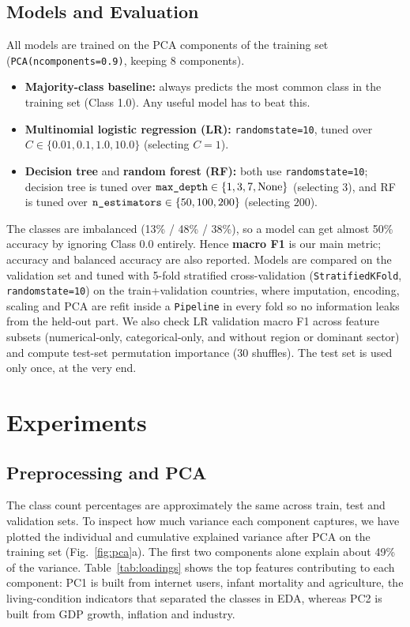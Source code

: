 \documentclass[10pt,a4paper]{article}
\renewcommand{\_}{\oldus\allowbreak}
\begin{document}
\subsection{Models and Evaluation}

All models are trained on the PCA components of the training set
(\texttt{PCA(n\_components=0.9)}, keeping 8 components).
\begin{itemize}[leftmargin=*]
  \item \textbf{Majority-class baseline:} always predicts the most common
        class in the training set (Class 1.0). Any useful model has to beat
        this.
  \item \textbf{Multinomial logistic regression (LR):} \texttt{random\_state=10},
        tuned over $C \in \{0.01, 0.1, 1.0, 10.0\}$ (selecting $C=1$).
  \item \textbf{Decision tree} and \textbf{random forest (RF):} both use
        \texttt{random\_state=10}; decision tree is tuned over
        $\texttt{max\_depth} \in \{1, 3, 7, \text{None}\}$ (selecting $3$),
        and RF is tuned over $\texttt{n\_estimators} \in \{50, 100, 200\}$
        (selecting $200$).
\end{itemize}

\noindent The classes are imbalanced (13\% / 48\% / 38\%), so a model can get
almost 50\% accuracy by ignoring Class 0.0 entirely. Hence \textbf{macro F1}
is our main metric; accuracy and balanced accuracy are also reported. Models
are compared on the validation set and tuned with 5-fold stratified
cross-validation (\texttt{StratifiedKFold}, \texttt{random\_state=10}) on
the train+validation countries, where imputation, encoding, scaling and PCA
are refit inside a \texttt{Pipeline} in every fold so no information leaks
from the held-out part. We also check LR validation macro F1 across feature
subsets (numerical-only, categorical-only, and without region or dominant
sector) and compute test-set permutation importance (30 shuffles). The test
set is used only once, at the very end.
\section{Experiments}

\subsection{Preprocessing and PCA}

The class count percentages are approximately the same across train, test
and validation sets. To inspect how much variance each component captures,
we have plotted the individual and cumulative explained variance after PCA on
the training set (Fig.~\ref{fig:pca}a). The first two components alone
explain about 49\% of the variance. Table~\ref{tab:loadings} shows the top
features contributing to each component: PC1 is built from internet users,
infant mortality and agriculture, the living-condition indicators that
separated the classes in EDA, whereas PC2 is built from GDP growth,
inflation and industry.
\end{document}

